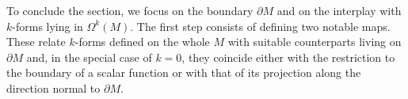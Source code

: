 %
%



%
%

To conclude the section, we focus on the boundary $\partial M$ and on the interplay with $k$-forms lying in $\Omega^k(M)$. The first step consists of defining two notable maps. These relate $k$-forms defined on the whole $M$ with suitable counterparts living on $\partial M$ and, in the special case of $k=0$, they coincide either with the restriction to the boundary of a scalar function or with that of its projection along the direction normal to $\partial M$.


